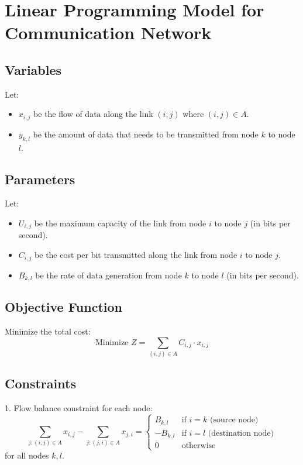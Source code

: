 \documentclass{article}
\begin{document}
\section*{Linear Programming Model for Communication Network}

\subsection*{Variables}
Let:
\begin{itemize}
    \item \(x_{i,j}\) be the flow of data along the link \((i,j)\) where \((i,j) \in A\).
    \item \(y_{k,l}\) be the amount of data that needs to be transmitted from node \(k\) to node \(l\).
\end{itemize}

\subsection*{Parameters}
Let:
\begin{itemize}
    \item \(U_{i,j}\) be the maximum capacity of the link from node \(i\) to node \(j\) (in bits per second).
    \item \(C_{i,j}\) be the cost per bit transmitted along the link from node \(i\) to node \(j\).
    \item \(B_{k,l}\) be the rate of data generation from node \(k\) to node \(l\) (in bits per second).
\end{itemize}

\subsection*{Objective Function}
Minimize the total cost:
\[
\text{Minimize } Z = \sum_{(i,j) \in A} C_{i,j} \cdot x_{i,j}
\]

\subsection*{Constraints}
1. Flow balance constraint for each node:
\[
\sum_{j: (i,j) \in A} x_{i,j} - \sum_{j: (j,i) \in A} x_{j,i} = 
\begin{cases}
B_{k,l} & \text{if } i = k \text{ (source node)} \\
-B_{k,l} & \text{if } i = l \text{ (destination node)} \\
0 & \text{otherwise}
\end{cases}
\]
for all nodes \(k, l\).
\end{document}
